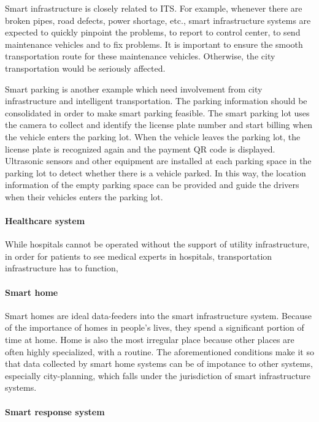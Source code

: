 \documentclass[letterpaper, twocolumn, 10pt, conference]{IEEEtran}
\begin{document}
Smart infrastructure is closely related to ITS. For example, whenever there are broken pipes, road defects, power shortage, etc., smart infrastructure systems are expected to quickly pinpoint the problems, to report to control center, to send maintenance vehicles and to fix problems. It is important to ensure the smooth transportation route for these maintenance vehicles. Otherwise, the city transportation would be seriously affected. 

Smart parking is another example which need involvement from city infrastructure and intelligent transportation. The parking information should be consolidated in order to make smart parking feasible. The smart parking lot uses the camera to collect and identify the license plate number and start billing when the vehicle enters the parking lot. When the vehicle leaves the parking lot, the license plate is recognized again and the payment QR code is displayed. Ultrasonic sensors and other equipment are installed at each parking space in the parking lot to detect whether there is a vehicle parked. In this way, the location information of the empty parking space can be provided and guide the drivers when their vehicles enters the parking lot.


\paragraph{Healthcare system}

While hospitals cannot be operated without the support of utility infrastructure, 
in order for patients to see medical experts in hospitals, transportation infrastructure has to function, 

\paragraph{Smart home}

Smart homes are ideal data-feeders into the smart infrastructure system. Because of the importance of homes in people’s lives, they spend a significant portion of time at home. Home is also the most irregular place because other places are often highly specialized, with a routine. The aforementioned conditions make it so that data collected by smart home systems can be of impotance to other systems, especially city-planning, which falls under the jurisdiction of smart infrastructure systems.

\paragraph{Smart response system}
\end{document}
